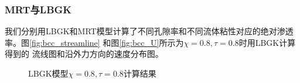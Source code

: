\subsubsection{MRT与LBGK}
我们分别用LBGK和MRT模型计算了不同孔隙率和不同流体粘性对应的绝对渗透率。图\ref{fig:bcc_streamline}
和图\ref{fig:bcc_U}所示为$\chi = 0.8,\tau=0.8$时用LBGK计算得到的
流线图和沿外力方向的速度分布图。
\begin{figure}[htb]
  \centering
  \caption{LBGK模型$\chi=0.8, \tau=0.8$计算结果}
\end{figure}

